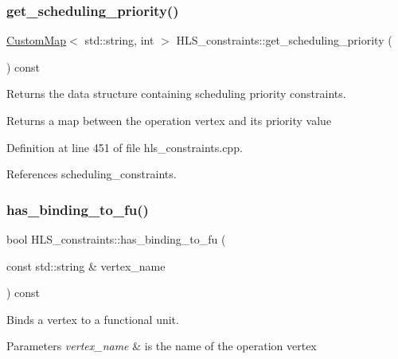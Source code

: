 \subsubsection{\texorpdfstring{get\+\_\+scheduling\+\_\+priority()}{get\_scheduling\_priority()}}
{\footnotesize\ttfamily \hyperlink{custom__map_8hpp_a18ca01763abbe3e5623223bfe5aaac6b}{Custom\+Map}$<$ std\+::string, int $>$ H\+L\+S\+\_\+constraints\+::get\+\_\+scheduling\+\_\+priority (\begin{DoxyParamCaption}{ }\end{DoxyParamCaption}) const}



Returns the data structure containing scheduling priority constraints. 

\begin{DoxyReturn}{Returns}
a map between the operation vertex and its priority value 
\end{DoxyReturn}


Definition at line 451 of file hls\+\_\+constraints.\+cpp.



References scheduling\+\_\+constraints.

\mbox{\label{classHLS__constraints_ad09187107d9a2ad9a674a1c0f5e6ecae}} 
\subsubsection{\texorpdfstring{has\+\_\+binding\+\_\+to\+\_\+fu()}{has\_binding\_to\_fu()}}
{\footnotesize\ttfamily bool H\+L\+S\+\_\+constraints\+::has\+\_\+binding\+\_\+to\+\_\+fu (\begin{DoxyParamCaption}\item[{const std\+::string \&}]{vertex\+\_\+name }\end{DoxyParamCaption}) const}



Binds a vertex to a functional unit. 


\begin{DoxyParams}{Parameters}
{\em vertex\+\_\+name} & is the name of the operation vertex \\
\hline
\end{DoxyParams}


